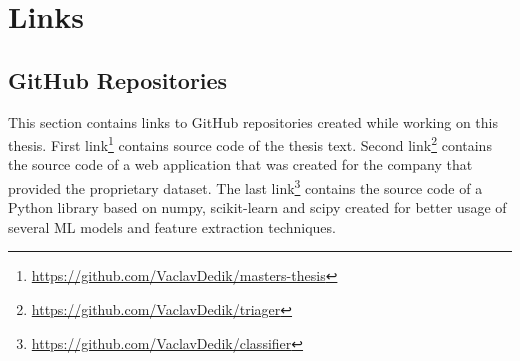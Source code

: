 \documentclass[nopalatino,nolot,nolof,color]{fithesis3}
\begin{document}
 \chapter{Links}
 \label{appendix:links}

 \section{GitHub Repositories}

 This section contains links to GitHub repositories created while working on this thesis. First link\footnote{\url{https://github.com/VaclavDedik/masters-thesis}} contains source code of the thesis text. Second link\footnote{\url{https://github.com/VaclavDedik/triager}} contains the source code of a web application that was created for the company that provided the proprietary dataset. The last link\footnote{\url{https://github.com/VaclavDedik/classifier}} contains the source code of a Python library based on numpy, scikit-learn and scipy created for better usage of several ML models and feature extraction techniques.

 \todos
\end{document}
